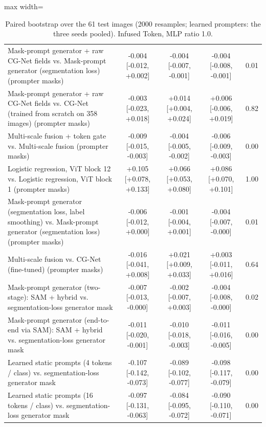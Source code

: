 \begin{table}[htbp]
\begin{adjustbox}{max width=\linewidth}
\begin{tabular}{lcccc}
Mask-prompt generator + raw CG-Net fields vs. Mask-prompt generator (segmentation loss) (prompter masks) & -0.004 [-0.012, +0.002] & -0.004 [-0.007, -0.001] & -0.004 [-0.008, -0.001] & 0.01 \\
Mask-prompt generator + raw CG-Net fields vs. CG-Net (trained from scratch on 358 images) (prompter masks) & -0.003 [-0.023, +0.018] & +0.014 [+0.004, +0.024] & +0.006 [-0.006, +0.019] & 0.82 \\
Multi-scale fusion + token gate vs. Multi-scale fusion (prompter masks) & -0.009 [-0.015, -0.003] & -0.004 [-0.005, -0.002] & -0.006 [-0.009, -0.003] & 0.00 \\
Logistic regression, ViT block 12 vs. Logistic regression, ViT block 1 (prompter masks) & +0.105 [+0.078, +0.133] & +0.066 [+0.053, +0.080] & +0.086 [+0.070, +0.101] & 1.00 \\
Mask-prompt generator (segmentation loss, label smoothing) vs. Mask-prompt generator (segmentation loss) (prompter masks) & -0.006 [-0.012, +0.000] & -0.001 [-0.004, +0.001] & -0.004 [-0.007, -0.000] & 0.01 \\
Multi-scale fusion vs. CG-Net (fine-tuned) (prompter masks) & -0.016 [-0.041, +0.008] & +0.021 [+0.009, +0.033] & +0.003 [-0.011, +0.016] & 0.64 \\
Mask-prompt generator (two-stage): SAM + hybrid vs. segmentation-loss generator mask & -0.007 [-0.013, -0.000] & -0.002 [-0.007, +0.003] & -0.004 [-0.008, -0.000] & 0.02 \\
Mask-prompt generator (end-to-end via SAM): SAM + hybrid vs. segmentation-loss generator mask & -0.011 [-0.020, -0.001] & -0.010 [-0.018, -0.003] & -0.011 [-0.016, -0.005] & 0.00 \\
Learned static prompts (4 tokens / class) vs. segmentation-loss generator mask & -0.107 [-0.142, -0.073] & -0.089 [-0.102, -0.077] & -0.098 [-0.117, -0.079] & 0.00 \\
Learned static prompts (16 tokens / class) vs. segmentation-loss generator mask & -0.097 [-0.131, -0.063] & -0.084 [-0.095, -0.072] & -0.090 [-0.110, -0.071] & 0.00 \\
\bottomrule
\end{tabular}
\end{adjustbox}
\caption{Paired bootstrap over the 61 test images (2000 resamples; learned prompters: the three seeds pooled). Infused Token, MLP ratio 1.0.}
\label{tab:bootstrap_infused_mlp1}
\end{table}
